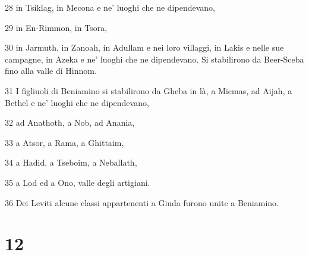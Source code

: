 \par 28 in Tsiklag, in Mecona e ne' luoghi che ne dipendevano,
\par 29 in En-Rimmon, in Tsora,
\par 30 in Jarmuth, in Zanoah, in Adullam e nei loro villaggi, in Lakis e nelle sue campagne, in Azeka e ne' luoghi che ne dipendevano. Si stabilirono da Beer-Sceba fino alla valle di Hinnom.
\par 31 I figliuoli di Beniamino si stabilirono da Gheba in là, a Micmas, ad Aijah, a Bethel e ne' luoghi che ne dipendevano,
\par 32 ad Anathoth, a Nob, ad Anania,
\par 33 a Atsor, a Rama, a Ghittaim,
\par 34 a Hadid, a Tseboim, a Neballath,
\par 35 a Lod ed a Ono, valle degli artigiani.
\par 36 Dei Leviti alcune classi appartenenti a Giuda furono unite a Beniamino.

\chapter{12}

